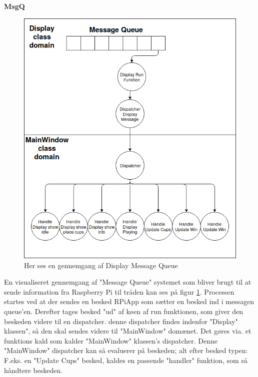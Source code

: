 \documentclass[Softwaredesign/Softwaredesign_main.tex]{subfiles}
\begin{document}
\textbf{MsgQ}

\begin{figure}[H]
    \centering
    \includegraphics[scale=0.5]{Softwaredesign/GUI/Pictures/Display_MsgQ.png}
    \caption{Her ses en gennemgang af Display Message Queue}
    \label{displaymsgq}
\end{figure}

En visualiseret gennemgang af "Message Queue" systemet som bliver brugt til at sende information fra Raspberry Pi til tråden kan ses på figur \ref{displaymsgq}. Processen startes ved at der sendes en besked RPiApp som sætter en besked ind i messagen queue'en. Derefter tages besked "ud" af køen af run funktionen, som giver den beskeden videre til en dispatcher. denne dispatcher findes indenfor "Display" klassen", så den skal sendes videre til "MainWindow" domænet. Det gøres via. et funktions kald som kalder "MainWindow" klassen's dispatcher.  Denne "MainWindow" dispatcher kan så evaluerer på beskeden; alt efter besked typen: F.eks. en "Update Cups" besked, kaldes en passende "handler" funktion, som så håndtere beskeden. 
\end{document}
